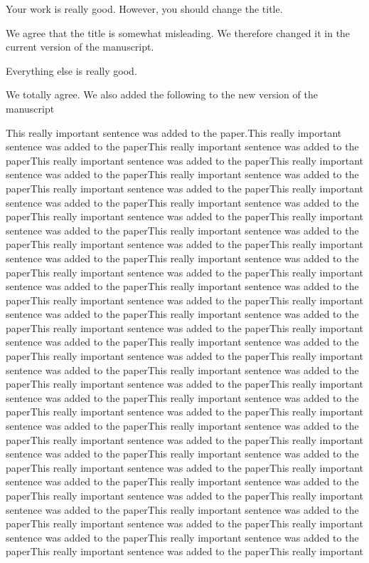 \reviewer
\begin{revcomment}
	Your work is really good. However, you should change the title.
\end{revcomment}
\begin{revresponse}
	We agree that the title is somewhat misleading.
	We therefore changed it in the current version of the manuscript.
\end{revresponse}

\begin{revcomment}
	Everything else is really good.
\end{revcomment}
\begin{revresponse}
	We totally agree. We also added the following to the new version of the manuscript
	\begin{changes}
		This really important sentence was added to the paper.This really important sentence was added to the paperThis really important sentence was added to the paperThis really important sentence was added to the paperThis really important sentence was added to the paperThis really important sentence was added to the paperThis really important sentence was added to the paperThis really important sentence was added to the paperThis really important sentence was added to the paperThis really important sentence was added to the paperThis really important sentence was added to the paperThis really important sentence was added to the paperThis really important sentence was added to the paperThis really important sentence was added to the paperThis really important sentence was added to the paperThis really important sentence was added to the paperThis really important sentence was added to the paperThis really important sentence was added to the paperThis really important sentence was added to the paperThis really important sentence was added to the paperThis really important sentence was added to the paperThis really important sentence was added to the paperThis really important sentence was added to the paperThis really important sentence was added to the paperThis really important sentence was added to the paperThis really important sentence was added to the paperThis really important sentence was added to the paperThis really important sentence was added to the paperThis really important sentence was added to the paperThis really important sentence was added to the paperThis really important sentence was added to the paperThis really important sentence was added to the paperThis really important sentence was added to the paperThis really important sentence was added to the paperThis really important sentence was added to the paperThis really important sentence was added to the paperThis really important sentence was added to the paperThis really important sentence was added to the paperThis really important sentence was added to the paperThis really important sentence was added to the paperThis really important sentence was added to the paperThis really important sentence was added to the paperThis really important sentence was added to the paperThis really important sentence was added to the paperThis really important sentence was added to the paperThis really important sentence was added to the paperThis really important 
\end{changes}
\end{revresponse}
